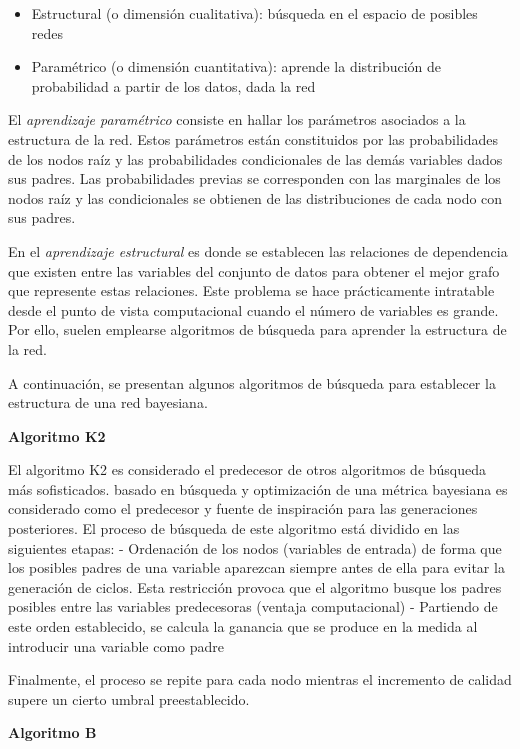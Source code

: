 \documentclass[
  a4paper,
  DIV=11,
  numbers=noendperiod]{scrreprt}
\providecommand{\tightlist}{%
  \setlength{\itemsep}{0pt}\setlength{\parskip}{0pt}}\usepackage{longtable,booktabs,array}
\begin{document}
\begin{itemize}
\tightlist
\item
  Estructural (o dimensión cualitativa): búsqueda en el espacio de
  posibles redes
\item
  Paramétrico (o dimensión cuantitativa): aprende la distribución de
  probabilidad a partir de los datos, dada la red
\end{itemize}

El \emph{aprendizaje paramétrico} consiste en hallar los parámetros
asociados a la estructura de la red. Estos parámetros están constituidos
por las probabilidades de los nodos raíz y las probabilidades
condicionales de las demás variables dados sus padres. Las
probabilidades previas se corresponden con las marginales de los nodos
raíz y las condicionales se obtienen de las distribuciones de cada nodo
con sus padres.

En el \emph{aprendizaje estructural} es donde se establecen las
relaciones de dependencia que existen entre las variables del conjunto
de datos para obtener el mejor grafo que represente estas relaciones.
Este problema se hace prácticamente intratable desde el punto de vista
computacional cuando el número de variables es grande. Por ello, suelen
emplearse algoritmos de búsqueda para aprender la estructura de la red.

A continuación, se presentan algunos algoritmos de búsqueda para
establecer la estructura de una red bayesiana.

\textbf{Algoritmo K2}

El algoritmo K2 es considerado el predecesor de otros algoritmos de
búsqueda más sofisticados. basado en búsqueda y optimización de una
métrica bayesiana es considerado como el predecesor y fuente de
inspiración para las generaciones posteriores. El proceso de búsqueda de
este algoritmo está dividido en las siguientes etapas: - Ordenación de
los nodos (variables de entrada) de forma que los posibles padres de una
variable aparezcan siempre antes de ella para evitar la generación de
ciclos. Esta restricción provoca que el algoritmo busque los padres
posibles entre las variables predecesoras (ventaja computacional) -
Partiendo de este orden establecido, se calcula la ganancia que se
produce en la medida al introducir una variable como padre

Finalmente, el proceso se repite para cada nodo mientras el incremento
de calidad supere un cierto umbral preestablecido.

\textbf{Algoritmo B}
\end{document}
